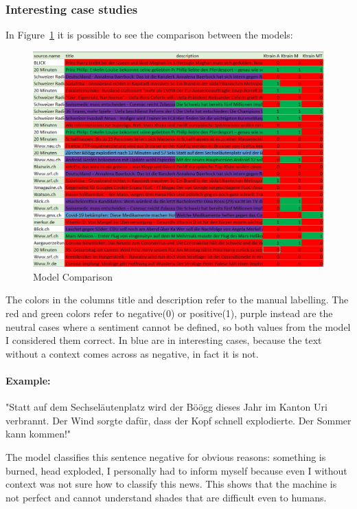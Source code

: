\subsubsection{Interesting case studies}
In Figure~\ref{fig:fig_09} it is possible to see the comparison between the models: 
\begin{figure}[H]
\centering
\includegraphics[width=1\textwidth]{images/ktrainmanual.jpg}
\caption{Model Comparison}
\label{fig:fig_09}
\end{figure}
\FloatBarrier
The colors in the columns title and description refer to the manual labelling.
The red and green colors refer to negative(0) or positive(1), purple instead are the neutral cases where a sentiment cannot be defined, so both values from the model I considered them correct.
In blue are in interesting cases, because the text without a context comes across as negative, in fact it is not.

\paragraph{Example:}
"Statt auf dem Sechseläutenplatz wird der Böögg dieses Jahr im Kanton Uri verbrannt. Der Wind sorgte dafür, dass der Kopf schnell explodierte. Der Sommer kann kommen!"

The model classifies this sentence negative for obvious reasons:
something is burned, head exploded, I personally had to inform myself because even I without context was not sure how to classify this news. This shows that the machine is not perfect and cannot understand shades that are difficult even to humans.

